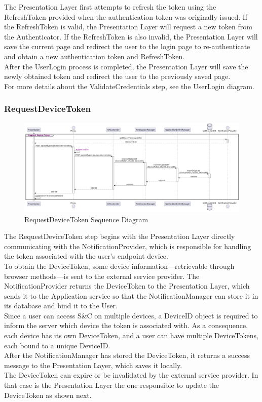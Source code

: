 The Presentation Layer first attempts to refresh the token using the RefreshToken provided when the authentication token was originally issued.
If the RefreshToken is valid, the Presentation Layer will request a new token from the Authenticator.
If the RefreshToken is also invalid, the Presentation Layer will save the current page and redirect the user to the login page to re-authenticate and obtain a new authentication token and RefreshToken.\\
After the UserLogin process is completed, the Presentation Layer will save the newly obtained token and redirect the user to the previously saved page.\\
For more details about the ValidateCredentials step, see the UserLogin diagram.

\subsubsection*{RequestDeviceToken}
\begin{figure}[H]
    \centering
    \includegraphics[width=\linewidth]{Latex/Images/DD/SequenceDiagrams/1.3RequestDeviceToken.png}
    \caption{RequestDeviceToken Sequence Diagram}
    \label{fig:requestdevicetoken}
\end{figure}
The RequestDeviceToken step begins with the Presentation Layer directly communicating with the NotificationProvider, which is responsible for handling the token associated with the user's endpoint device.\\
To obtain the DeviceToken, some device information—retrievable through browser methods—is sent to the external service provider. The NotificationProvider returns the DeviceToken to the Presentation Layer, which sends it to the Application service so that the NotificationManager can store it in its database and bind it to the User.\\
Since a user can access S\&C on multiple devices, a DeviceID object is required to inform the server which device the token is associated with. As a consequence, each device has its own DeviceToken, and a user can have multiple DeviceTokens, each bound to a unique DeviceID.\\
After the NotificationManager has stored the DeviceToken, it returns a success message to the Presentation Layer, which saves it locally.\\
The DeviceToken can expire or be invalidated by the external service provider. In that case is the Presentation Layer the one responsible to update the DeviceToken as shown next.


